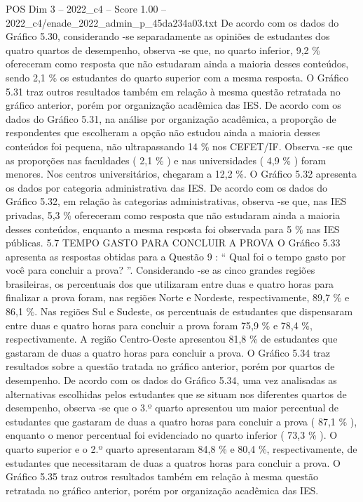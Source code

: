 \begin{textsample}{POS Dim 3 – 2022\_c4 – Score 1.00 – 2022\_c4/enade\_2022\_admin\_p\_45da234a03.txt}
De acordo com os dados do Gráfico 5.30, considerando -se separadamente as opiniões de estudantes dos quatro quartos de desempenho, observa -se que, no quarto inferior, 9,2 \% ofereceram como resposta que não estudaram ainda a maioria desses conteúdos, sendo 2,1 \% os estudantes do quarto superior com a mesma resposta.
O Gráfico 5.31 traz outros resultados também em relação à mesma questão retratada no gráfico anterior, porém por organização acadêmica das IES.
De acordo com os dados do Gráfico 5.31, na análise por organização acadêmica, a proporção de respondentes que escolheram a opção não estudou ainda a maioria desses conteúdos foi pequena, não ultrapassando 14 \% nos CEFET/IF.
Observa -se que as proporções nas faculdades ( 2,1 \% ) e nas universidades ( 4,9 \% ) foram menores.
Nos centros universitários, chegaram a 12,2 \%.
O Gráfico 5.32 apresenta os dados por categoria administrativa das IES.
De acordo com os dados do Gráfico 5.32, em relação às categorias administrativas, observa -se que, nas IES privadas, 5,3 \% ofereceram como resposta que não estudaram ainda a maioria desses conteúdos, enquanto a mesma resposta foi observada para 5 \% nas IES públicas. 5.7 TEMPO GASTO PARA CONCLUIR A PROVA O Gráfico 5.33 apresenta as respostas obtidas para a Questão 9 : “ Qual foi o tempo gasto por você para concluir a prova? ”.
Considerando -se as cinco grandes regiões brasileiras, os percentuais dos que utilizaram entre duas e quatro horas para finalizar a prova foram, nas regiões Norte e Nordeste, respectivamente, 89,7 \% e 86,1 \%.
Nas regiões Sul e Sudeste, os percentuais de estudantes que dispensaram entre duas e quatro horas para concluir a prova foram 75,9 \% e 78,4 \%, respectivamente.
A região Centro-Oeste apresentou 81,8 \% de estudantes que gastaram de duas a quatro horas para concluir a prova.
O Gráfico 5.34 traz resultados sobre a questão tratada no gráfico anterior, porém por quartos de desempenho.
De acordo com os dados do Gráfico 5.34, uma vez analisadas as alternativas escolhidas pelos estudantes que se situam nos diferentes quartos de desempenho, observa -se que o 3.º quarto apresentou um maior percentual de estudantes que gastaram de duas a quatro horas para concluir a prova ( 87,1 \% ), enquanto o menor percentual foi evidenciado no quarto inferior ( 73,3 \% ).
O quarto superior e o 2.º quarto apresentaram 84,8 \% e 80,4 \%, respectivamente, de estudantes que necessitaram de duas a quatros horas para concluir a prova.
O Gráfico 5.35 traz outros resultados também em relação à mesma questão retratada no gráfico anterior, porém por organização acadêmica das IES.

\end{textsample}
